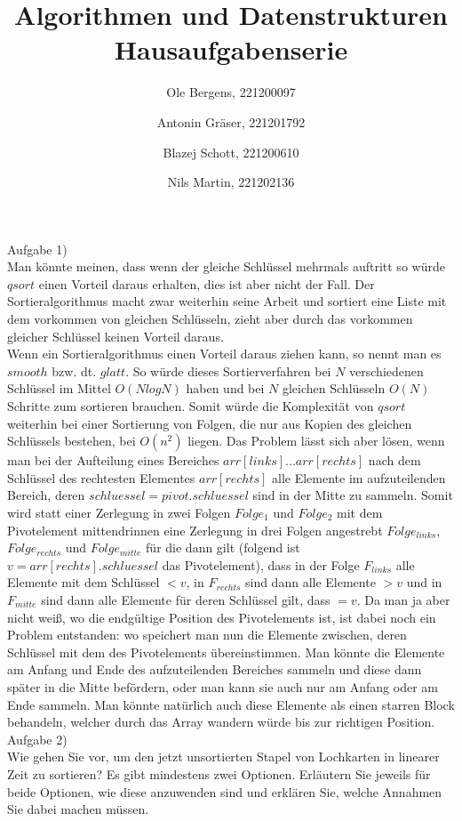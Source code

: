\documentclass{article}
\title{Algorithmen und Datenstrukturen Hausaufgabenserie}
\author{
    \small Ole Bergens, 221200097\and
    \small Antonin Gräser, 221201792\and
    \small Blazej Schott, 221200610\and
    \small Nils Martin, 221202136
}
\begin{document}
\maketitle\noindent
Aufgabe 1)\\
Man könnte meinen, dass wenn der gleiche Schlüssel mehrmals auftritt so würde $qsort$ einen Vorteil daraus erhalten, dies ist aber nicht der Fall. Der Sortieralgorithmus macht zwar weiterhin seine Arbeit und sortiert eine Liste mit dem vorkommen von gleichen Schlüsseln, zieht aber durch das vorkommen gleicher Schlüssel keinen Vorteil daraus.\\
Wenn ein Sortieralgorithmus einen Vorteil daraus ziehen kann, so nennt man es $smooth$ bzw. dt. $glatt$. So würde dieses Sortierverfahren bei $N$ verschiedenen Schlüssel im Mittel $O(NlogN)$ haben und bei $N$ gleichen Schlüsseln $O(N)$ Schritte zum sortieren brauchen. Somit würde die Komplexität von $qsort$ weiterhin bei einer Sortierung von Folgen, die nur aus Kopien des gleichen Schlüssels bestehen, bei $O(n^2)$ liegen. Das Problem lässt sich aber lösen, wenn man bei der Aufteilung eines Bereiches $arr[links]...arr[rechts]$ nach dem Schlüssel des rechtesten Elementes $arr[rechts]$ alle Elemente im aufzuteilenden Bereich, deren $schluessel=pivot.schluessel$ sind in der Mitte zu sammeln. Somit wird statt einer Zerlegung in zwei Folgen $Folge_1$ und $Folge_2$ mit dem Pivotelement mittendrinnen eine Zerlegung in drei Folgen angestrebt $Folge_{links}$, $Folge_{rechts}$ und $Folge_{mitte}$ für die dann gilt (folgend ist $v=arr[rechts].schluessel$ das Pivotelement), dass in der Folge $F_{links}$ alle Elemente mit dem Schlüssel $<v$, in $F_{rechts}$ sind dann alle Elemente $>v$ und in $F_{mitte}$ sind dann alle Elemente für deren Schlüssel gilt, dass $=v$. Da man ja aber nicht weiß, wo die endgültige Position des Pivotelements ist, ist dabei noch ein Problem entstanden: wo speichert man nun die Elemente zwischen, deren Schlüssel mit dem des Pivotelements übereinstimmen. Man könnte die Elemente am Anfang und Ende des aufzuteilenden Bereiches sammeln und diese dann später in die Mitte befördern, oder man kann sie auch nur am Anfang oder am Ende sammeln. Man könnte natürlich auch diese Elemente als einen starren Block behandeln, welcher durch das Array wandern würde bis zur richtigen Position.
\newpage\noindent
Aufgabe 2)\\
[...] Wie gehen Sie vor, um den jetzt unsortierten Stapel von Lochkarten in linearer Zeit zu sortieren? Es gibt mindestens zwei Optionen. Erläutern Sie jeweils für beide Optionen, wie diese anzuwenden sind und erklären Sie, welche Annahmen Sie dabei machen müssen.\\
\end{document}
